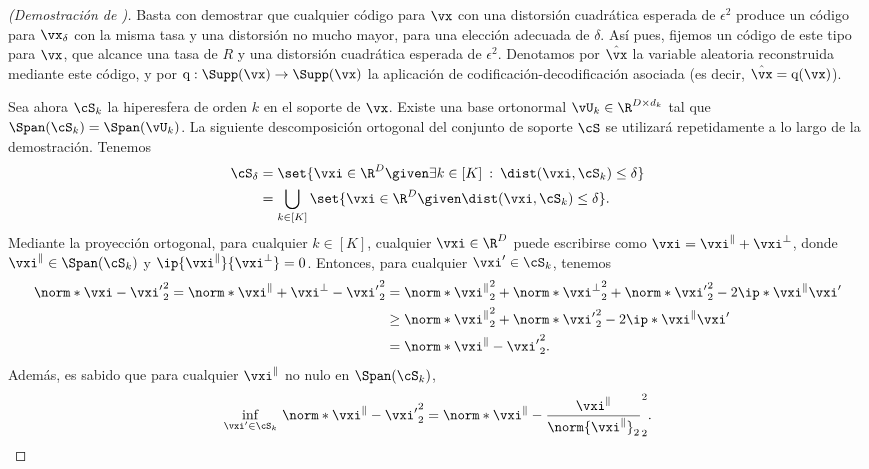\documentclass[../../book-main_es.tex]{subfiles}
\begin{document}
\begin{proof}[(Demostración de )]
    Basta con demostrar que cualquier código para $\vx$ con una distorsión cuadrática esperada
    de $\epsilon^2$ produce un código para $\vx_{\delta}$ con la misma tasa y
    una distorsión no mucho mayor, para una elección adecuada de $\delta$.
    Así pues, fijemos un código de este tipo para $\vx$, que alcance una tasa de $R$ y una distorsión cuadrática
    esperada de $\epsilon^2$. Denotamos por $\hat{\vx}$ la variable aleatoria
    reconstruida mediante este código, y por $\mathrm{q} : \Supp(\vx) \to \Supp(\vx)$
    la aplicación de codificación-decodificación asociada (es decir, $\hat{\vx}
    = \mathrm{q}(\vx)$).

    Sea ahora $\cS_k$ la hiperesfera de orden $k$ en el soporte de $\vx$.
    Existe una base ortonormal $\vU_k \in \R^{D \times d_k}$ tal que
    $\Span(\cS_k) = \Span(\vU_k)$.
    La siguiente descomposición ortogonal del conjunto de soporte $\cS$
    se utilizará repetidamente a lo largo de la demostración.
    Tenemos
    \begin{align}
        \cS_{\delta}
        &= \set{\vxi \in \R^D \given \exists k \in [K] \::\: \dist(\vxi,
        \cS_k) \leq \delta}
        \\
        &= \bigcup_{k \in [K]} \set{\vxi \in \R^D \given \dist(\vxi,
        \cS_k) \leq \delta}.
    \end{align}
    Mediante la proyección ortogonal, para cualquier $k \in [K]$, cualquier $\vxi \in \R^D$ puede
    escribirse como $\vxi = \vxi^{\|} + \vxi^{\perp}$, donde $\vxi^{\|} \in
    \Span(\cS_k)$
    y $\ip{\vxi^{\|}}{\vxi^\perp} = 0$.
    Entonces, para cualquier $\vxi' \in \cS_k$, tenemos
    \begin{align}
        \norm*{\vxi - \vxi'}_2^2
        =
        \norm*{\vxi^{\|} + \vxi^{\perp} - \vxi'}_2^2
        &=
        \norm*{\vxi^{\|}}_2^2 + \norm*{\vxi^{\perp}}_2^2 + \norm*{\vxi'}_2^2
        - 2 \ip*{\vxi^{\|}}{\vxi'}
        \\
        &\geq
        \norm*{\vxi^{\|}}_2^2 + \norm*{\vxi'}_2^2
        - 2 \ip*{\vxi^{\|}}{\vxi'}
        \\
        &=
        \norm*{\vxi^{\|} - \vxi'}_2^2.
    \end{align}
    Además, es sabido que para cualquier $\vxi^{\|}$ no nulo en $\Span(\cS_k)$,
    \begin{equation}
        \inf_{\vxi' \in \cS_k}\,
        \norm*{\vxi^{\|} - \vxi'}_2^2
        =
        \norm*{\vxi^{\|} - \frac{\vxi^{\|}}{\norm{\vxi^{\|}}_2}}_2^2.

\end{equation}
\end{proof}
\end{document}
